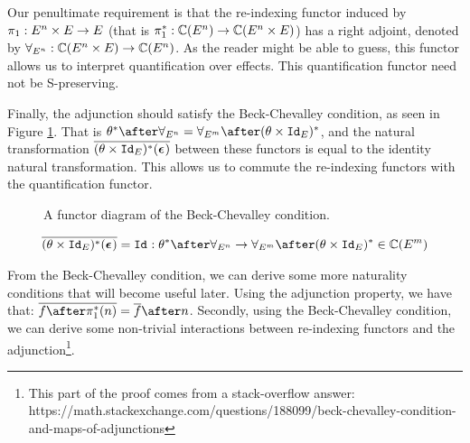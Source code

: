 Our penultimate requirement is that the re-indexing functor induced by $\pi_1: E^n\times E\rightarrow E$ (that is $\pi_1^*: \mathbb{C}(E^n) \rightarrow \mathbb{C}(E^n\times E)$) has a right adjoint, denoted by $\forall_{E^n}: \mathbb{C}(E^n\times E) \rightarrow \mathbb{C}(E^n)$. As the reader might be able to guess, this functor allows us to interpret quantification over effects. This quantification functor need not be S-preserving.

Finally, the adjunction should satisfy the Beck-Chevalley condition, as seen in Figure \ref{BeckChevalleyDiagram}. That is $\theta\star\after\allEn = \allEm\after(\theta\times\Id{E})\star$, and the natural transformation $\overline{(\theta\times\texttt{Id}_{E})^*(\boldsymbol{\epsilon}_{})}$ between these functors is equal to the identity natural transformation. This allows us to commute the re-indexing functors with the quantification functor.

\begin{figure}
    \begin{framed}
        \centering
        
    \end{framed}
    \caption{A functor diagram of the Beck-Chevalley condition.}
    \label{BeckChevalleyDiagram}
\end{figure}

\begin{align*}
    \bar{(\theta\times\Id{E})\star(\counit{})} = \Id{}: \theta\star\after\allEn \rightarrow \allEm\after(\theta\times\Id{E})\star\in \C(E^m)
\end{align*}

From the Beck-Chevalley condition, we can derive some more naturality conditions that will become useful later.
Using the adjunction property, we have that: $\bar{f\after\pstar(n)} = \bar{f}\after n$. Secondly, using the Beck-Chevalley condition, we can derive some non-trivial interactions between re-indexing functors and the adjunction\footnote{This part of the proof comes from a stack-overflow answer: https://math.stackexchange.com/questions/188099/beck-chevalley-condition-and-maps-of-adjunctions}. 

